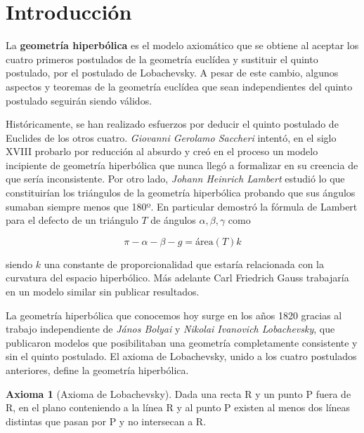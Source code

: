 \documentclass{article}
\theoremstyle{plain}
\theoremstyle{definition}
\newtheorem*{axiom}{Axioma}
\theoremstyle{remark}
\begin{document}
\maketitle

\newpage
\tableofcontents
\newpage

\section{Introducción}

La \textbf{geometría hiperbólica} es el modelo axiomático que se
obtiene al aceptar los cuatro primeros postulados de la geometría
euclídea y sustituir el quinto postulado, por el postulado de
Lobachevsky. A pesar de este cambio, algunos aspectos y teoremas
de la geometría euclídea que sean independientes del quinto postulado
seguirán siendo válidos.

Históricamente, se han realizado esfuerzos por deducir el quinto
postulado de Euclides de los otros cuatro. \textit{Giovanni Gerolamo
  Saccheri} intentó, en el siglo XVIII probarlo por reducción al
absurdo y creó en el proceso un modelo incipiente de geometría
hiperbólica que nunca llegó a formalizar en su creencia de que sería
inconsistente. Por otro lado, \textit{Johann Heinrich Lambert} estudió
lo que constituirían los triángulos de la geometría hiperbólica probando
que sus ángulos sumaban siempre menos que 180º. En particular demostró
la fórmula de Lambert para el defecto de un triángulo $T$ de ángulos
$\alpha,\beta,\gamma$ como

\[
  \pi - \alpha- \beta - g = \mathrm{área}(T)k
\]

siendo $k$ una constante de proporcionalidad que estaría relacionada
con la curvatura del espacio hiperbólico. \cite{cedelberg89} Más adelante Carl Friedrich
Gauss trabajaría en un modelo similar sin publicar resultados.

La geometría hiperbólica que conocemos hoy surge en los años 1820
gracias al trabajo independiente de \textit{János Bolyai} y
\textit{Nikolai Ivanovich Lobachevsky}, que publicaron modelos que
posibilitaban una geometría completamente consistente y sin el quinto
postulado. El axioma de Lobachevsky, unido a los cuatro postulados
anteriores, define la geometría hiperbólica.

\begin{axiom}[Axioma de Lobachevsky]
  Dada una recta R y un punto P fuera de R, en el plano conteniendo a
  la línea R y al punto P existen al menos dos líneas distintas que pasan
  por P y no intersecan a R.
\end{axiom}
\end{document}
